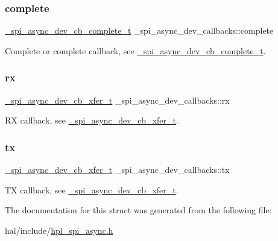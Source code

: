 \subsubsection{\texorpdfstring{complete}{complete}}
{\footnotesize\ttfamily \hyperlink{group__hpl__spi_ga446094494e8aacbf4ad1a74c868d9809}{\+\_\+spi\+\_\+async\+\_\+dev\+\_\+cb\+\_\+complete\+\_\+t} \+\_\+spi\+\_\+async\+\_\+dev\+\_\+callbacks\+::complete}

Complete or complete callback, see \hyperlink{group__hpl__spi_ga446094494e8aacbf4ad1a74c868d9809}{\+\_\+spi\+\_\+async\+\_\+dev\+\_\+cb\+\_\+complete\+\_\+t}. \mbox{\label{struct__spi__async__dev__callbacks_ad8adad74d94a9483eef159503a900dae}} 
\subsubsection{\texorpdfstring{rx}{rx}}
{\footnotesize\ttfamily \hyperlink{group__hpl__spi_ga62275ef9b2c245ed2ed183f9d1c98a31}{\+\_\+spi\+\_\+async\+\_\+dev\+\_\+cb\+\_\+xfer\+\_\+t} \+\_\+spi\+\_\+async\+\_\+dev\+\_\+callbacks\+::rx}

RX callback, see \hyperlink{group__hpl__spi_ga62275ef9b2c245ed2ed183f9d1c98a31}{\+\_\+spi\+\_\+async\+\_\+dev\+\_\+cb\+\_\+xfer\+\_\+t}. \mbox{\label{struct__spi__async__dev__callbacks_a11f5eabd90c9c4be55cc0c29bc30cbad}} 
\subsubsection{\texorpdfstring{tx}{tx}}
{\footnotesize\ttfamily \hyperlink{group__hpl__spi_ga62275ef9b2c245ed2ed183f9d1c98a31}{\+\_\+spi\+\_\+async\+\_\+dev\+\_\+cb\+\_\+xfer\+\_\+t} \+\_\+spi\+\_\+async\+\_\+dev\+\_\+callbacks\+::tx}

TX callback, see \hyperlink{group__hpl__spi_ga62275ef9b2c245ed2ed183f9d1c98a31}{\+\_\+spi\+\_\+async\+\_\+dev\+\_\+cb\+\_\+xfer\+\_\+t}. 

The documentation for this struct was generated from the following file\+:\begin{DoxyCompactItemize}
\item 
hal/include/\hyperlink{hpl__spi__async_8h}{hpl\+\_\+spi\+\_\+async.\+h}\end{DoxyCompactItemize}
